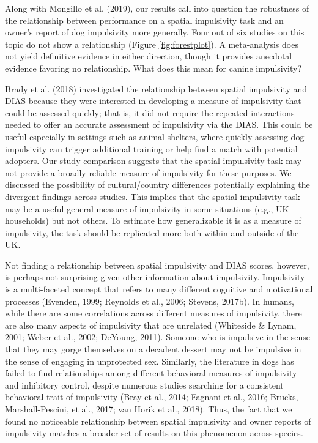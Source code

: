 \documentclass[
  pub,floatsintext]{apa6}
\begin{document}
Along with Mongillo et al. (2019), our results call into question the robustness of the relationship between performance on a spatial impulsivity task and an owner's report of dog impulsivity more generally. Four out of six studies on this topic do not show a relationship (Figure \ref{fig:forestplot}). A meta-analysis does not yield definitive evidence in either direction, though it provides anecdotal evidence favoring no relationship. What does this mean for canine impulsivity?

Brady et al. (2018) investigated the relationship between spatial impulsivity and DIAS because they were interested in developing a measure of impulsivity that could be assessed quickly; that is, it did not require the repeated interactions needed to offer an accurate assessment of impulsivity via the DIAS. This could be useful especially in settings such as animal shelters, where quickly assessing dog impulsivity can trigger additional training or help find a match with potential adopters. Our study comparison suggests that the spatial impulsivity task may not provide a broadly reliable measure of impulsivity for these purposes. We discussed the possibility of cultural/country differences potentially explaining the divergent findings across studies. This implies that the spatial impulsivity task may be a useful general measure of impulsivity in some situations (e.g., UK households) but not others. To estimate how generalizable it is as a measure of impulsivity, the task should be replicated more both within and outside of the UK.

Not finding a relationship between spatial impulsivity and DIAS scores, however, is perhaps not surprising given other information about impulsivity. Impulsivity is a multi-faceted concept that refers to many different cognitive and motivational processes (Evenden, 1999; Reynolds et al., 2006; Stevens, 2017b). In humans, while there are some correlations across different measures of impulsivity, there are also many aspects of impulsivity that are unrelated (Whiteside \& Lynam, 2001; Weber et al., 2002; DeYoung, 2011). Someone who is impulsive in the sense that they may gorge themselves on a decadent dessert may not be impulsive in the sense of engaging in unprotected sex. Similarly, the literature in dogs has failed to find relationships among different behavioral measures of impulsivity and inhibitory control, despite numerous studies searching for a consistent behavioral trait of impulsivity (Bray et al., 2014; Fagnani et al., 2016; Brucks, Marshall-Pescini, et al., 2017; van Horik et al., 2018). Thus, the fact that we found no noticeable relationship between spatial impulsivity and owner reports of impulsivity matches a broader set of results on this phenomenon across species.
\end{document}
